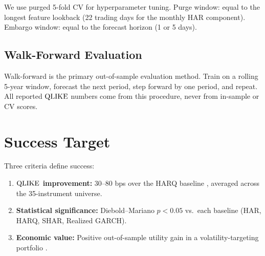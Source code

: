 We use purged 5-fold CV for hyperparameter tuning.
Purge window: equal to the longest feature lookback (22 trading days for the monthly HAR component).
Embargo window: equal to the forecast horizon (1 or 5 days).


\subsection{Walk-Forward Evaluation}
\label{sec:walk-forward}

Walk-forward is the primary out-of-sample evaluation method.
Train on a rolling 5-year window, forecast the next period, step forward by one period, and repeat.
All reported $\operatorname{QLIKE}$ numbers come from this procedure, never from in-sample or CV scores.

\begin{center}
\end{center}


\section{Success Target}
\label{sec:success-target}

Three criteria define success:

\begin{enumerate}[nosep]
  \item \textbf{$\operatorname{QLIKE}$ improvement:} 30--80 bps over the HARQ baseline \citep{BPQ2016}, averaged across the 35-instrument universe.
  \item \textbf{Statistical significance:} Diebold--Mariano $p < 0.05$ vs.\ each baseline (HAR, HARQ, SHAR, Realized GARCH).
  \item \textbf{Economic value:} Positive out-of-sample utility gain in a volatility-targeting portfolio \citep{MoreiraMuir2017}.
\end{enumerate}


